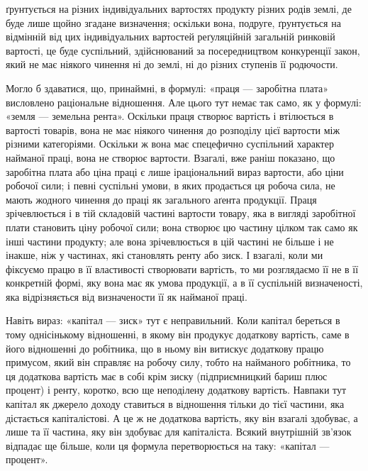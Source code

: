 \parcont{}  %
ґрунтується на різних індивідуальних вартостях продукту різних родів землі,
де буде лише щойно згадане визначення; оскільки вона, подруге, ґрунтується на
відмінній від цих індивідуальних вартостей реґуляційній загальній ринковій
вартості, це буде суспільний, здійснюваний за посередництвом конкуренції закон,
який не має ніякого чинення ні до землі, ні до різних ступенів її родючости.

Могло б здаватися, що, принаймні, в формулі: «праця — заробітна плата»
висловлено раціональне відношення. Але цього тут немає так само, як у формулі:
«земля — земельна рента». Оскільки праця створює вартість і втілюється
в вартості товарів, вона не має ніякого чинення до розподілу цієї вартости між
різними категоріями. Оскільки ж вона має спецефично суспільний характер
найманої праці, вона не створює вартости. Взагалі, вже раніш показано, що
заробітна плата або ціна праці є лише іраціональний вираз вартости, або ціни
робочої сили; і певні суспільні умови, в яких продається ця робоча сила, не
мають жодного чинення до праці як загального аґента продукції. Праця зрічевлюється
і в тій складовій частині вартости товару, яка в вигляді заробітної
плати становить ціну робочої сили; вона створює цю частину цілком так само
як інші частини продукту; але вона зрічевлюється в цій частині не більше і
не інакше, ніж у частинах, які становлять ренту або зиск. І взагалі, коли ми
фіксуємо працю в її властивості створювати вартість, то ми розглядаємо її не
в її конкретній формі, яку вона має як умова продукції, а в її суспільній
визначеності, яка відрізняється від визначености її як найманої праці.

Навіть вираз: «капітал — зиск» тут є неправильний. Коли капітал береться
в тому однісінькому відношенні, в якому він продукує додаткову вартість,
саме в його відношенні до робітника, що в ньому він витискує додаткову працю
примусом, який він справляє на робочу силу, тобто на найманого робітника,
то ця додаткова вартість має в собі крім зиску (підприємницкий бариш плюс
процент) і ренту, коротко, всю ще неподілену додаткову вартість. Навпаки тут
капітал як джерело доходу ставиться в відношення тільки до тієї частини, яка
дістається капіталістові. А це ж не додаткова вартість, яку він взагалі здобуває,
а лише та її частина, яку він здобуває для капіталіста. Всякий внутрішній
зв’язок відпадає ще більше, коли ця формула перетворюється на таку: «капітал
— процент».

